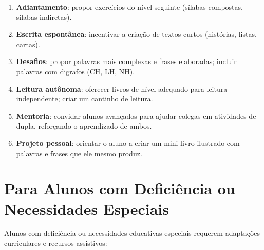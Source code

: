 \begin{enumerate}[leftmargin=2cm]
  \item \textbf{Adiantamento}: propor exerc\'{i}cios do n\'{i}vel
  seguinte (s\'{i}labas compostas, s\'{i}labas indiretas).

  \item \textbf{Escrita espont\^{a}nea}: incentivar a cria\c{c}\~{a}o
  de textos curtos (hist\'{o}rias, listas, cartas).

  \item \textbf{Desafios}: propor palavras mais complexas e frases
  elaboradas; incluir palavras com digrafos (CH, LH, NH).

  \item \textbf{Leitura aut\^{o}noma}: oferecer livros de n\'{i}vel
  adequado para leitura independente; criar um cantinho de leitura.

  \item \textbf{Mentoria}: convidar alunos avan\c{c}ados para ajudar
  colegas em atividades de dupla, refor\c{c}ando o aprendizado de ambos.

  \item \textbf{Projeto pessoal}: orientar o aluno a criar um mini-livro
  ilustrado com palavras e frases que ele mesmo produz.
\end{enumerate}

\section{Para Alunos com Defici\^{e}ncia ou Necessidades Especiais}

Alunos com defici\^{e}ncia ou necessidades educativas especiais
requerem adapta\c{c}\~{o}es curriculares e recursos assistivos:


